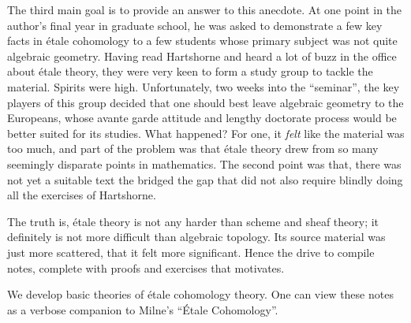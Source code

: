 The third main goal is to provide an answer to this anecdote. At 
one point in the author's final year in graduate school, he was 
asked to demonstrate a few key facts in \'etale cohomology to a 
few students whose primary subject was not quite algebraic 
geometry. Having read Hartshorne and heard a lot of buzz in the 
office about \'etale theory, they were very keen to form a study 
group to tackle the material. Spirits were high. Unfortunately,
two weeks into the ``seminar'', the key players of this group 
decided that one should best leave algebraic geometry to the 
Europeans, whose avante garde attitude and lengthy doctorate 
process would be better suited for its studies. What happened? 
For one, it \emph{felt} like the material was too much, and part 
of the problem was that \'etale theory drew from so many seemingly 
disparate points in mathematics. The second point was that, there 
was not yet a suitable text the bridged the gap that did not also 
require blindly doing all the exercises of Hartshorne.

The truth is, \'etale theory is not any harder than scheme and
sheaf theory; it definitely is not more difficult than algebraic
topology. Its source material was just more scattered, that it
felt more significant. Hence the drive to compile notes, complete 
with proofs and exercises that motivates.

We develop basic theories of \'etale cohomology theory. One can
view these notes as a verbose companion to Milne's ``\'Etale
Cohomology''.
